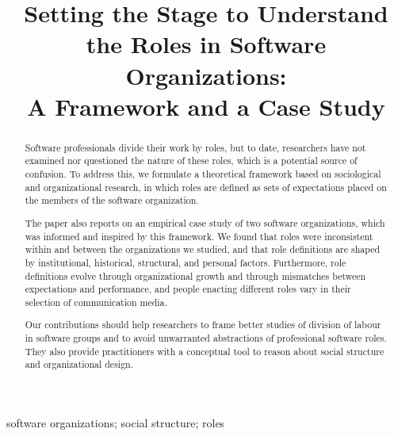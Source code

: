 \documentclass[10pt, conference, compsocconf]{IEEEtran}
\begin{document}
\title{Setting the Stage to Understand the Roles in Software Organizations:\\
A Framework and a Case Study}

\author{
}

\maketitle


\begin{abstract}

Software professionals divide their work by roles, but to date, researchers have not examined nor questioned the nature of these roles, which is a potential source of confusion. To address this, we formulate a theoretical framework based on sociological and organizational research, in which roles are defined as sets of expectations placed on the members of the software organization.

The paper also reports on an empirical case study of two software organizations, which was informed and inspired by this framework. We found that roles were inconsistent within and between the organizations we studied, and that role definitions are shaped by institutional, historical, structural, and personal factors. Furthermore, role definitions evolve through organizational growth and through mismatches between expectations and performance, and people enacting different roles vary in their selection of communication media.

Our contributions should help researchers to frame better studies of division of labour in software groups and to avoid unwarranted abstractions of professional software roles. They also provide practitioners with a conceptual tool to reason about social structure and organizational design.

\end{abstract}

\begin{IEEEkeywords}
software organizations; social structure; roles
\end{IEEEkeywords}

\end{document}
